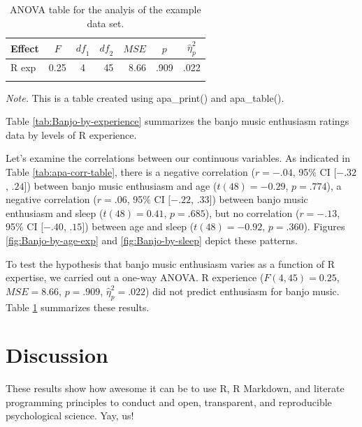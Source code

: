 \documentclass[english,man]{apa6}
\theoremstyle{definition}
\theoremstyle{definition}
\theoremstyle{definition}
\theoremstyle{remark}
\begin{document}
\begin{table}[tbp]
\begin{center}
\begin{threeparttable}
\caption{\label{tab:Banjo-aov-table}ANOVA table for the analyis of the example data set.}
\begin{tabular}{lrcrrrl}
\toprule
Effect & \multicolumn{1}{c}{$F$} & \multicolumn{1}{c}{$\mathit{df}_1$} & \multicolumn{1}{c}{$\mathit{df}_2$} & \multicolumn{1}{c}{$\mathit{MSE}$} & \multicolumn{1}{c}{$p$} & \multicolumn{1}{c}{$\hat{\eta}^2_p$}\\
\midrule
R exp & 0.25 & 4 & 45 & 8.66 & .909 & .022\\
\bottomrule
\addlinespace
\end{tabular}
\begin{tablenotes}[para]
\textit{Note.} This is a table created using apa\_print() and apa\_table().
\end{tablenotes}
\end{threeparttable}
\end{center}
\end{table}

Table \ref{tab:Banjo-by-experience} summarizes the banjo music
enthusiasm ratings data by levels of R experience.

Let's examine the correlations between our continuous variables. As
indicated in Table \ref{tab:apa-corr-table}, there is a negative
correlation (\(r = -.04\), 95\% CI \([-.32\), \(.24]\)) between banjo
music enthusiasm and age (\(t(48) = -0.29\), \(p = .774\)), a negative
correlation (\(r = .06\), 95\% CI \([-.22\), \(.33]\)) between banjo
music enthusiasm and sleep (\(t(48) = 0.41\), \(p = .685\)), but no
correlation (\(r = -.13\), 95\% CI \([-.40\), \(.15]\)) between age and
sleep (\(t(48) = -0.92\), \(p = .360\)). Figures
\ref{fig:Banjo-by-age-exp} and \ref{fig:Banjo-by-sleep} depict these
patterns.

To test the hypothesis that banjo music enthusiasm varies as a function
of R expertise, we carried out a one-way ANOVA. R experience
(\(F(4, 45) = 0.25\), \(\mathit{MSE} = 8.66\), \(p = .909\),
\(\hat{\eta}^2_p = .022\)) did not predict enthusiasm for banjo music.
Table \ref{tab:Banjo-aov-table} summarizes these results.

\section{Discussion}\label{discussion}

These results show how awesome it can be to use R, R Markdown, and
literate programming principles to conduct and open, transparent, and
reproducible psychological science. Yay, us!
\end{document}
